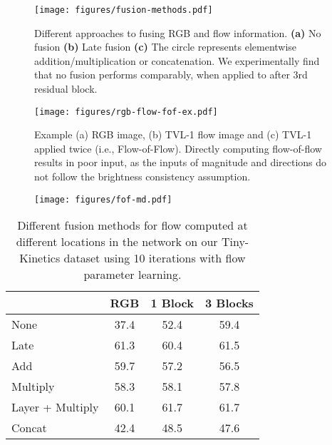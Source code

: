 \documentclass[10pt,twocolumn,letterpaper]{article}
\begin{document}
\begin{figure}
    \centering
      \texttt{[image: figures/fusion-methods.pdf]}
      \caption{Different approaches to fusing RGB and flow information. {\bf (a)} No fusion {\bf (b)} Late fusion {\bf (c)} The circle represents elementwise addition/multiplication or concatenation. We experimentally find that no fusion performs comparably, when applied to after 3rd residual block.}
      \label{fig:fuse-method}
\end{figure}
\begin{figure}
    \centering
      \texttt{[image: figures/rgb-flow-fof-ex.pdf]}
      \caption{Example (a) RGB image, (b) TVL-1 flow image and (c) TVL-1 applied twice (i.e., Flow-of-Flow). Directly computing flow-of-flow results in poor input, as the inputs of magnitude and directions do not follow the brightness consistency assumption.}
      \label{fig:fof-ex}
\end{figure}
\begin{figure}
    \centering
      \texttt{[image: figures/fof-md.pdf]}
      \label{fig:fof-model}
\end{figure}

\begin{table}
  \caption{Different fusion methods for flow computed at different locations in the network on our Tiny-Kinetics dataset using 10 iterations with flow parameter learning.}
  \label{tab:fuse}
  \centering
  \begin{tabular}{lccc}
    \toprule
                      &  RGB & 1 Block & 3 Blocks \\
    \midrule
    None              & 37.4  & 52.4   & 59.4 \\
    Late              & 61.3  & 60.4   & 61.5 \\
    Add               & 59.7  & 57.2   & 56.5  \\
    Multiply          & 58.3  & 58.1   & 57.8 \\
    Layer + Multiply  & 60.1  & 61.7   & 61.7 \\
    Concat            & 42.4  & 48.5   & 47.6 \\
    \bottomrule
  \end{tabular}
\end{table}
\end{document}
